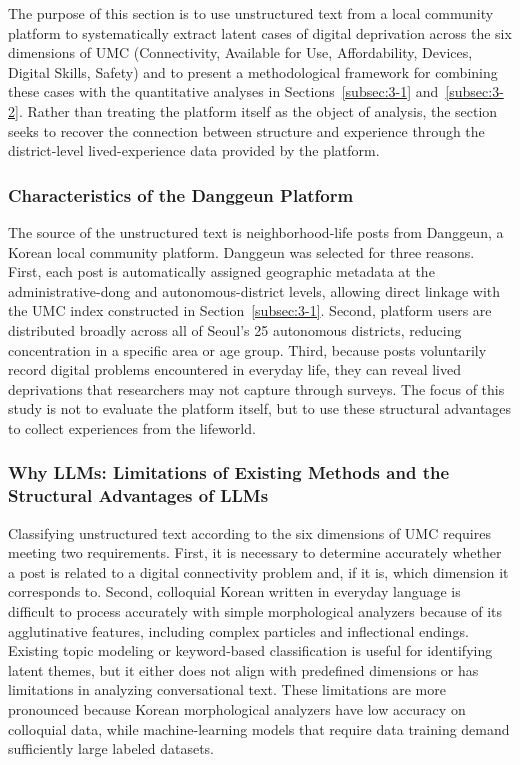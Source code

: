 The purpose of this section is to use unstructured text from a local community platform to systematically extract latent cases of digital deprivation across the six dimensions of UMC (Connectivity, Available for Use, Affordability, Devices, Digital Skills, Safety) and to present a methodological framework for combining these cases with the quantitative analyses in Sections~\ref{subsec:3-1} and~\ref{subsec:3-2}. Rather than treating the platform itself as the object of analysis, the section seeks to recover the connection between structure and experience through the district-level lived-experience data provided by the platform.

\subsubsection{Characteristics of the Danggeun Platform}
\label{subsubsec:3-3-1}

The source of the unstructured text is neighborhood-life posts from Danggeun, a Korean local community platform. Danggeun was selected for three reasons. First, each post is automatically assigned geographic metadata at the administrative-dong and autonomous-district levels, allowing direct linkage with the UMC index constructed in Section~\ref{subsec:3-1}. Second, platform users are distributed broadly across all of Seoul's 25 autonomous districts, reducing concentration in a specific area or age group. Third, because posts voluntarily record digital problems encountered in everyday life, they can reveal lived deprivations that researchers may not capture through surveys. The focus of this study is not to evaluate the platform itself, but to use these structural advantages to collect experiences from the lifeworld.

\subsubsection{Why LLMs: Limitations of Existing Methods and the Structural Advantages of LLMs}
\label{subsubsec:3-3-2}

Classifying unstructured text according to the six dimensions of UMC requires meeting two requirements. First, it is necessary to determine accurately whether a post is related to a digital connectivity problem and, if it is, which dimension it corresponds to. Second, colloquial Korean written in everyday language is difficult to process accurately with simple morphological analyzers because of its agglutinative features, including complex particles and inflectional endings. Existing topic modeling or keyword-based classification is useful for identifying latent themes, but it either does not align with predefined dimensions or has limitations in analyzing conversational text. These limitations are more pronounced because Korean morphological analyzers have low accuracy on colloquial data, while machine-learning models that require data training demand sufficiently large labeled datasets.

